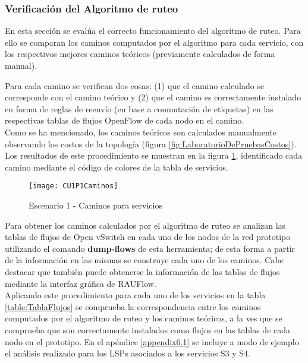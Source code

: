 

\subsubsection{Verificaci\'on del Algoritmo de ruteo}
En esta secci\'on se eval\'ua el correcto funcionamiento del algoritmo de ruteo. Para ello se comparan los caminos computados por el algoritmo para cada servicio, con los respectivos mejores caminos te\'oricos (previamente calculados de forma manual). 

Para cada camino se verifican dos cosas: (1) que el camino calculado se corresponde con el camino te\'orico y (2) que el camino es correctamente instalado en forma de reglas de reenvío (en base a conmutaci\'on de etiquetas) en las respectivas tablas de flujos OpenFlow de cada nodo en el camino.\\

Como se ha mencionado, los caminos te\'oricos son calculados manualmente observando los costos de la topolog\'ia (figura \ref{fig:LaboratorioDePruebasCostos}). Los resultados de este procedimiento se muestran en la figura \ref{fig:CUP1Caminos}, identificado cada camino mediante el código de colores de la tabla de servicios.\\

\begin{figure}[ht!] 
\centering    
\texttt{[image: CU1P1Caminos]}
\caption[Escenario 1 - Caminos para servicios]{Escenario 1 - Caminos para servicios}
\label{fig:CUP1Caminos}
\end{figure}

Para obtener los caminos calculados por el algoritmo de ruteo se analizan las tablas de flujos de Open vSwitch en cada uno de los nodos de la red prototipo utilizando el comando \textbf{dump-flows} de esta herramienta; de esta forma a partir de la informaci\'on en las mismas se construye cada uno de los caminos. Cabe destacar que tambi\'en puede obtenerse la informaci\'on de las tablas de flujos mediante la interfaz gráfica de RAUFlow.\\

Aplicando este procedimiento para cada uno de los servicios en la tabla \ref{table:TablaFlujos} se comprueba la correspondencia entre los caminos computados por el algoritmo de ruteo y los caminos te\'oricos, a la ves que se comprueba que son correctamente instalados como flujos en las tablas de cada nodo en el prototipo. En el apéndice \ref{appendix6.1} se incluye a modo de ejemplo el análisis realizado para los LSPs asociados a los servicios S3 y S4.\\ 
 
